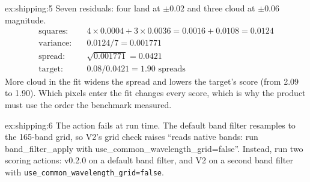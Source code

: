\begin{solution}{ex:shipping:5}
Seven residuals: four land at $\pm 0.02$ and three cloud at $\pm 0.06$ magnitude.
\begin{align*}
\text{squares:}\quad & 4 \times 0.0004 + 3 \times 0.0036 = 0.0016 + 0.0108 = 0.0124\\
\text{variance:}\quad & 0.0124 / 7 = 0.001771\\
\text{spread:}\quad & \sqrt{0.001771} = 0.0421\\
\text{target:}\quad & 0.08 / 0.0421 = 1.90 \text{ spreads}
\end{align*}
More cloud in the fit widens the spread and lowers the target's score (from 2.09 to 1.90). Which pixels enter the fit
changes every score, which is why the product must use the order the benchmark measured.
\end{solution}

\begin{solution}{ex:shipping:6}
The action fails at run time. The default band filter resamples to the 165-band grid, so V2's grid check raises ``reads
native bands: run band\_filter\_apply with use\_common\_wavelength\_grid=false''. Instead, run two scoring actions: v0.2.0
on a default band filter, and V2 on a second band filter with \texttt{use\_common\_wavelength\_grid=false}.
\end{solution}
